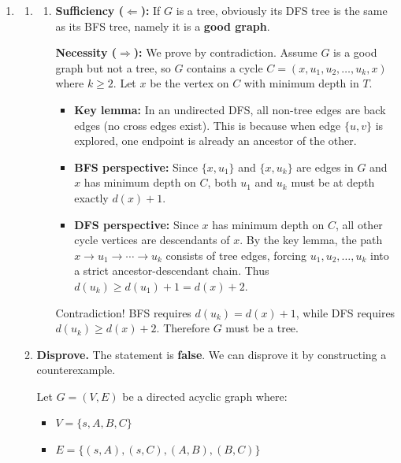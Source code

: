 \documentclass[12pt,a4paper]{article}
\makeatletter
\newtheorem*{solution}{Solution}
\theoremstyle{definition}
\renewenvironment{solution}[1][Solution] {\par\pushQED{\qed}\normalfont\topsep6\p@\@plus6\p@\relax\trivlist\item[\hskip\labelsep\bfseries#1\@addpunct{.}]\ignorespaces}{\popQED\endtrivlist\@endpefalse} \makeatother
\makeatother
\begin{document}
\begin{enumerate}
    \begin{solution}
        \begin{enumerate}
            \item 
                \begin{enumerate}
                    \item \textbf{Sufficiency ($\Leftarrow$):} 
                If $G$ is a tree, obviously its DFS tree is the same as its BFS tree, namely it is a \textbf{good graph}.
                
                \textbf{Necessity ($\Rightarrow$):}
                    We prove by contradiction. Assume $G$ is a good graph but not a tree, so $G$ contains a cycle $C = (x, u_1, u_2, \dots, u_k, x)$ where $k \ge 2$. Let $x$ be the vertex on $C$ with minimum depth in $T$.
                \begin{itemize}
                    \item \textbf{Key lemma:} In an undirected DFS, all non-tree edges are back edges (no cross edges exist). This is because when edge $\{u,v\}$ is explored, one endpoint is already an ancestor of the other.
                    
                    \item \textbf{BFS perspective:} Since $\{x, u_1\}$ and $\{x, u_k\}$ are edges in $G$ and $x$ has minimum depth on $C$, both $u_1$ and $u_k$ must be at depth exactly $d(x) + 1$.
                    
                    \item \textbf{DFS perspective:} Since $x$ has minimum depth on $C$, all other cycle vertices are descendants of $x$. By the key lemma, the path $x \to u_1 \to \cdots \to u_k$ consists of tree edges, forcing $u_1, u_2, \ldots, u_k$ into a strict ancestor-descendant chain. Thus $d(u_k) \ge d(u_1) + 1 = d(x) + 2$.
                
                \end{itemize}                
                    Contradiction! BFS requires $d(u_k) = d(x)+1$, while DFS requires $d(u_k) \ge d(x)+2$. Therefore $G$ must be a tree.
                \end{enumerate}
            \item \textbf{Disprove.} The statement is \textbf{false}. We can disprove it by constructing a counterexample.

        Let $G = (V, E)$ be a directed acyclic graph where:
        \begin{itemize}
            \item $V = \{s, A, B, C\}$
            \item $E = \{(s, A), (s, C), (A, B), (B, C)\}$
        \end{itemize}
        

\end{enumerate}
\end{solution}
\end{enumerate}
\end{document}
